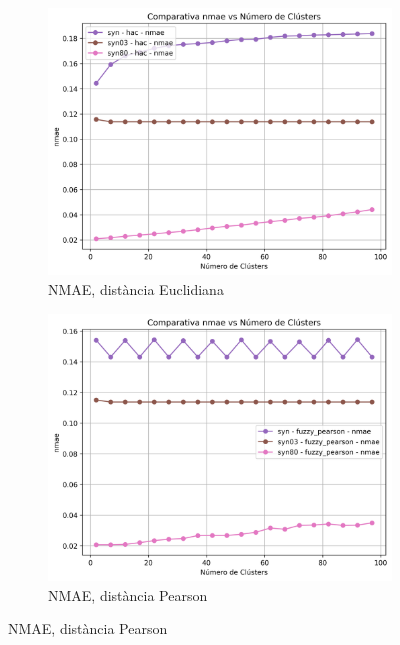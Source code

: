 \documentclass[a4paper,12pt]{report}
\begin{document}
\begin{figure}[H]
    \centering
    \begin{subfigure}[b]{0.49\textwidth}
        \includegraphics[width=\textwidth]{Figuras/nmae-hac-sin.png}
        \caption{NMAE, distància Euclidiana}
        \label{fig:hac-clustering-sin-results-a}
    \end{subfigure}
    \hfill
    \begin{subfigure}[b]{0.49\textwidth}
        \includegraphics[width=\textwidth]{Figuras/nmae-fuzzy_pearson-sin.png}
        \caption{NMAE, distància Pearson}
        \label{fig:hac-clustering-sin-results-b}
    \end{subfigure}


\end{figure}
\end{document}
